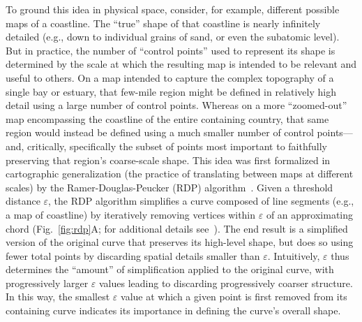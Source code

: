 \documentclass[10pt]{article}
\renewcommand{\nameref}[1]{\textit{\oldnameref{#1}}}
\begin{document}
To ground this idea in physical space, consider, for example, different possible maps of a coastline.
The ``true'' shape of that coastline is nearly infinitely detailed (e.g., down to individual grains of sand, or even the subatomic level).
But in practice, the number of ``control points'' used to represent its shape is determined by the scale at which the resulting map is intended to be relevant and useful to others.
On a map intended to capture the complex topography of a single bay or estuary, that few-mile region might be defined in relatively high detail using a large number of control points.
Whereas on a more ``zoomed-out'' map encompassing the coastline of the entire containing country, that same region would instead be defined using a much smaller number of control points---and, critically, specifically the subset of points most important to faithfully preserving that region's coarse-scale shape.
This idea was first formalized in cartographic generalization (the practice of translating between maps at different scales) by the Ramer-Douglas-Peucker (RDP) algorithm~\citep{Rame72,DougPeuc73}.
Given a threshold distance $\varepsilon$, the RDP algorithm simplifies a curve composed of line segments (e.g., a map of coastline) by iteratively removing vertices within $\varepsilon$ of an approximating chord (Fig.~\ref{fig:rdp}A; for additional details see~\nameref{subsec:rdp}).
The end result is a simplified version of the original curve that preserves its high-level shape, but does so using fewer total points by discarding spatial details smaller than $\varepsilon$.
Intuitively, $\varepsilon$ thus determines the ``amount'' of simplification applied to the original curve, with progressively larger $\varepsilon$ values leading to discarding progressively coarser structure.
In this way, the smallest $\varepsilon$ value at which a given point is first removed from its containing curve indicates its importance in defining the curve's overall shape.
\end{document}
